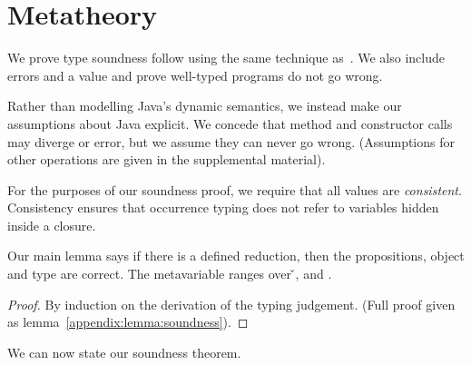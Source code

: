 \section{Metatheory}
\label{sec:metatheory}

We prove type soundness follow using the same technique as~\citet{TF10}. 
We also include errors and a \wrong{} value and prove
well-typed programs do not go wrong.

Rather than modelling Java's dynamic semantics, we instead
make our assumptions about Java explicit. We concede that
method and constructor calls may diverge or error, but we assume they can
never go wrong. (Assumptions for other operations are given in the supplemental
material).

{}





For the purposes of our soundness proof, we require that all values
are \emph{consistent}.
Consistency
ensures that occurrence typing does not refer to variables
hidden inside a closure.

{}

Our main lemma says if there is a defined reduction, then the propositions, object
and type are correct.
The metavariable  ranges over \v{}, \errorvalv{} and \wrong{}.

\begin{lemma}\label{main:lemma:soundness}

  {\soundnesslemmahypothesis}
  \begin{proof}
    By induction on the derivation of the typing judgement. 
    (Full proof given as lemma~\ref{appendix:lemma:soundness}).
  \end{proof}
\end{lemma}


We can now state our soundness theorem.

{}

{}
%
